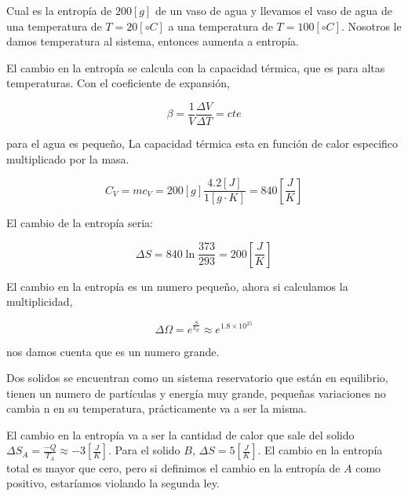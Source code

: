 \documentclass[11pt,fleqn]{book}
\begin{document}
\begin{example}

Cual es la entropía de $200 [g]$ de un vaso de agua y llevamos el vaso de agua de una temperatura de  $T=20 [\circ C]$ a una temperatura de  $T=100[\circ C]$. Nosotros le damos temperatura al sistema, entonces aumenta a entropía. 

El cambio en la entropía se calcula con la capacidad térmica, que es para altas temperaturas. Con el coeficiente de expansión,

\begin{equation*}
    \beta=\frac{1}{V}\frac{\Delta V}{\Delta T}=cte
\end{equation*}

para el agua es pequeño, La capacidad térmica esta en función de calor especifico multiplicado por la masa. 

\begin{equation*}
    C_{V}=mc_{V}=200[g]\frac{4.2[J]}{1[g\cdot K]}=840 [\frac{J}{K}]
\end{equation*}

El cambio de la entropía seria:

\begin{equation*}
    \Delta S=840\ln{\frac{373}{293}}=200 [\frac{J}{K}]
\end{equation*}

El cambio en la entropía es un numero pequeño, ahora si calculamos la multiplicidad,

\begin{equation*}
    \Delta\Omega=e^{\frac{S}{k_{B}}}\approx e^{1.8\times10^{25}}
\end{equation*}

nos damos cuenta que es un numero grande.
\end{example}

\begin{example}
Dos solidos se encuentran como un sistema reservatorio que están en equilibrio, tienen un numero de partículas y energía muy grande, pequeñas variaciones no cambia n en su temperatura, prácticamente va a ser la misma.


El cambio en la entropía va a ser la cantidad de calor que sale del solido $\Delta S_{A}=\frac{-Q}{T_{A}}\approx-3 [\frac{J}{K}]$. Para el solido $B$, $\Delta S=5[\frac{J}{K}]$. El cambio en la entropía total es mayor que cero, pero si definimos el cambio en la entropía de $A$ como positivo, estaríamos violando la segunda ley.
\end{example}
\end{document}
